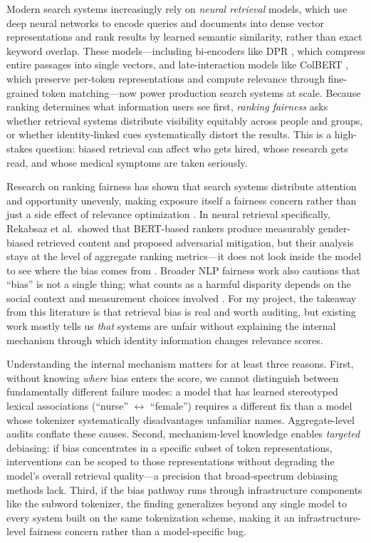 \documentclass[acmsmall,screen,review]{acmart}
\begin{document}
Modern search systems increasingly rely on \emph{neural retrieval} models, which use deep neural networks to encode queries and documents into dense vector representations and rank results by learned semantic similarity, rather than exact keyword overlap. These models---including bi-encoders like DPR \cite{karpukhin2020}, which compress entire passages into single vectors, and late-interaction models like ColBERT \cite{khattab2020,santhanam2022}, which preserve per-token representations and compute relevance through fine-grained token matching---now power production search systems at scale. Because ranking determines what information users see first, \emph{ranking fairness} asks whether retrieval systems distribute visibility equitably across people and groups, or whether identity-linked cues systematically distort the results. This is a high-stakes question: biased retrieval can affect who gets hired, whose research gets read, and whose medical symptoms are taken seriously.

Research on ranking fairness has shown that search systems distribute attention and opportunity unevenly, making exposure itself a fairness concern rather than just a side effect of relevance optimization \cite{singh2018}. In neural retrieval specifically, Rekabsaz et al.\ showed that BERT-based rankers produce measurably gender-biased retrieved content and proposed adversarial mitigation, but their analysis stays at the level of aggregate ranking metrics---it does not look inside the model to see where the bias comes from \cite{rekabsaz2021}. Broader NLP fairness work also cautions that ``bias'' is not a single thing; what counts as a harmful disparity depends on the social context and measurement choices involved \cite{blodgett2020}. For my project, the takeaway from this literature is that retrieval bias is real and worth auditing, but existing work mostly tells us \emph{that} systems are unfair without explaining the internal mechanism through which identity information changes relevance scores.

Understanding the internal mechanism matters for at least three reasons. First, without knowing \emph{where} bias enters the score, we cannot distinguish between fundamentally different failure modes: a model that has learned stereotyped lexical associations (``nurse'' $\leftrightarrow$ ``female'') requires a different fix than a model whose tokenizer systematically disadvantages unfamiliar names. Aggregate-level audits conflate these causes. Second, mechanism-level knowledge enables \emph{targeted} debiasing: if bias concentrates in a specific subset of token representations, interventions can be scoped to those representations without degrading the model's overall retrieval quality---a precision that broad-spectrum debiasing methods lack. Third, if the bias pathway runs through infrastructure components like the subword tokenizer, the finding generalizes beyond any single model to every system built on the same tokenization scheme, making it an infrastructure-level fairness concern rather than a model-specific bug.
\end{document}
